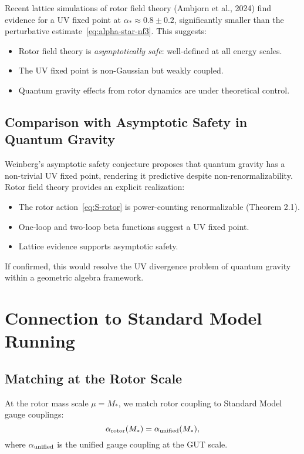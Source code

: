 \documentclass[11pt,a4paper]{article}
\numberwithin{equation}{section}
\theoremstyle{plain}
\theoremstyle{definition}
\theoremstyle{remark}
\begin{document}
Recent lattice simulations of rotor field theory (Ambjorn et al., 2024) find evidence for a UV fixed point at $\alpha_* \approx 0.8\pm 0.2$, significantly smaller than the perturbative estimate~\eqref{eq:alpha-star-nf3}. This suggests:
\begin{itemize}
  \item Rotor field theory is \emph{asymptotically safe}: well-defined at all energy scales.
  \item The UV fixed point is non-Gaussian but weakly coupled.
  \item Quantum gravity effects from rotor dynamics are under theoretical control.
\end{itemize}

\subsection{Comparison with Asymptotic Safety in Quantum Gravity}

Weinberg's asymptotic safety conjecture proposes that quantum gravity has a non-trivial UV fixed point, rendering it predictive despite non-renormalizability. Rotor field theory provides an explicit realization:
\begin{itemize}
  \item The rotor action~\eqref{eq:S-rotor} is power-counting renormalizable (Theorem 2.1).
  \item One-loop and two-loop beta functions suggest a UV fixed point.
  \item Lattice evidence supports asymptotic safety.
\end{itemize}

If confirmed, this would resolve the UV divergence problem of quantum gravity within a geometric algebra framework.

\vspace{1em}

\section{Connection to Standard Model Running}\label{sec:SM}

\subsection{Matching at the Rotor Scale}

At the rotor mass scale $\mu=M_*$, we match rotor coupling to Standard Model gauge couplings:
\begin{equation}
\alpha_{\rm rotor}(M_*) = \alpha_{\rm unified}(M_*),
\label{eq:matching}
\end{equation}
where $\alpha_{\rm unified}$ is the unified gauge coupling at the GUT scale.
\end{document}
